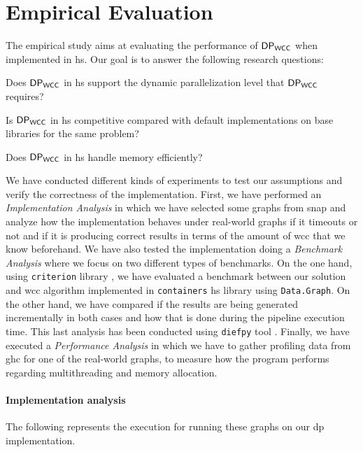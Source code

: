   

\section{Empirical Evaluation}
The empirical study aims at evaluating the performance of $\mathsf{DP_{WCC}}$ when implemented in \acrshort{hs}. 
Our goal is to answer the following research questions: 

\begin{inparaenum}[\bf {\bf RQ}1\upshape)]
\label{res:question}
    \item Does $\mathsf{DP_{WCC}}$ in \acrshort{hs} support the dynamic parallelization level that $\mathsf{DP_{WCC}}$ requires?
    \item Is $\mathsf{DP_{WCC}}$ in \acrshort{hs} competitive compared with default implementations on base libraries for the same problem?
    \item Does $\mathsf{DP_{WCC}}$ in \acrshort{hs} handle memory efficiently?
\end{inparaenum}

We have conducted different kinds of experiments to test our assumptions and verify the correctness of the implementation.
First, we have performed an \emph{Implementation Analysis} in which we have selected some graphs from \acrfull{snap} \cite{stanford} 
and analyze how the implementation behaves under real-world graphs if it timeouts or not and if it is producing correct results in terms of the amount of \acrshort{wcc} that we know beforehand.
We have also tested the implementation doing a \emph{Benchmark Analysis} where we focus on two different types of benchmarks. On the one hand, 
using \texttt{criterion} library \cite{criterion}, we have evaluated a benchmark between our solution and \acrshort{wcc} algorithm implemented in \texttt{containers} \acrshort{hs} library \cite{containers} 
using \texttt{Data.Graph}. On the other hand, we have compared if the results are being generated incrementally in both cases and how that is done during the pipeline execution time. 
This last analysis has been conducted using \texttt{diefpy} tool \cite{diefpaper,diefpy}.
Finally, we have executed a \textit{Performance Analysis} in which we have to gather profiling data from \acrfull{ghc} for one of the real-world graphs, to measure how the program performs 
regarding multithreading and memory allocation.

\paragraph{Implementation analysis} The following represents the execution for running these graphs on our \acrshort{dp} implementation.

